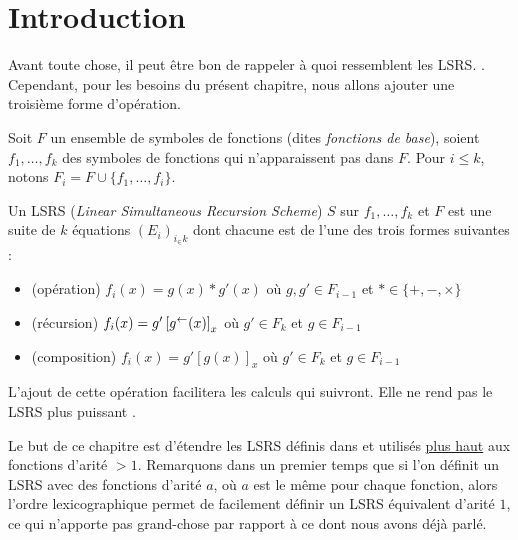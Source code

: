 	\section{Introduction}
	\label{sec:rintroduction}
	
	Avant toute chose, il peut être bon de rappeler à quoi ressemblent les LSRS. \cite{Schwentick1997} \cite{GrandjeanSchwentick2002}. Cependant, pour les besoins du présent chapitre, nous allons ajouter une troisième forme d'opération.
	
	
	\begin{definition}[LSRS]
		\label{def:LSRS_2}
		Soit $F$ un ensemble de symboles de fonctions (dites \emph{fonctions de base}), soient $f_1, \dots, f_k$ des symboles de fonctions qui n'apparaissent pas dans $F$. Pour $i\leqslant k$, notons $F_i = F\cup \{f_1, \dots, f_i\}$. 
	
		Un LSRS (\emph{Linear Simultaneous Recursion Scheme}) $S$ sur $f_1, \dots, f_k$ et $F$ est une suite de $k$ équations $\left(E_i\right)_{i_\in k}$ dont chacune est de l'une des trois formes suivantes :
		
		\begin{itemize}[itemsep=-1mm]
			\item 	(opération) 		$f_i(x) = g(x) * g'(x)$ où $g,g' \in F_{i-1}$ et $* \in \{+, -, \times \}$\footnotemark
			
			
			\item 	(récursion)			$f_i(x) = g'\left[ g^{\leftarrow}(x) \right]_{x}$ où $g' \in F_k$ et $g \in F_{i-1}$			
			
			\item 	(composition)			$f_i(x) = g'\left[g(x)\right]_x$ où $g' \in F_k$ et $g \in F_{i-1}$
		\end{itemize}
	\end{definition}
	
	\begin{remark}
		L'ajout de cette opération facilitera les calculs qui suivront. Elle ne rend pas le LSRS plus puissant \cite{GrandjeanSchwentick2002}.
	\end{remark}
	
	Le but de ce chapitre est d'étendre les LSRS définis dans \cite{GrandjeanSchwentick2002} et utilisés \hyperref[def:LSRS]{plus haut} aux fonctions d'arité $>1$. Remarquons dans un premier temps que si l'on définit un LSRS avec des fonctions d'arité $a$, où $a$ est le même pour chaque fonction, alors l'ordre lexicographique permet de facilement définir un LSRS équivalent d'arité $1$, ce qui n'apporte pas grand-chose par rapport à ce dont nous avons déjà parlé.
	
